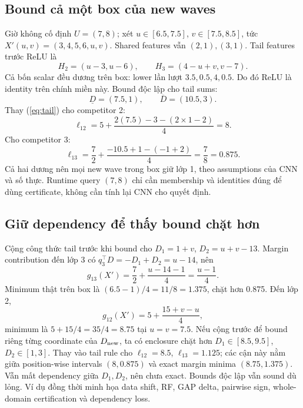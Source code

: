 \documentclass[11pt,a4paper]{article}
\theoremstyle{definition}
\begin{document}
\subsection{Bound cả một box của new waves}
Giờ không cố định $U=(7,8)$; xét $u\in[6.5,7.5]$, $v\in[7.5,8.5]$,
tức $X'(u,v)=(3,4,5,6,u,v)$. Shared features vẫn $(2,1),(3,1)$.
Tail features trước ReLU là
\begin{equation}
H_2=(u-3,u-6),\qquad H_3=(4-u+v,v-7).
\end{equation}
Cả bốn scalar đều dương trên box: lower lần lượt $3.5,0.5,4,0.5$.
Do đó ReLU là identity trên chính miền này. Bound độc lập cho tail sums:
\begin{equation}
\underline D=(7.5,1),\qquad\overline D=(10.5,3).
\end{equation}
Thay (\ref{eq:tail}) cho competitor 2:
\begin{equation}
\ell_{12}=5+\frac{2(7.5)-3-(2\times1-2)}4=8.
\end{equation}
Cho competitor 3:
\begin{equation}
\ell_{13}=\frac72+\frac{-10.5+1-(-1+2)}4=\frac78=0.875.
\end{equation}
Cả hai dương nên mọi new wave trong box giữ lớp 1, theo assumptions của
CNN và số thực. Runtime query $(7,8)$ chỉ cần membership và identities
đúng để dùng certificate, không cần tính lại CNN cho quyết định.

\subsection{Giữ dependency để thấy bound chặt hơn}
Cộng công thức tail trước khi bound cho
$D_1=1+v$, $D_2=u+v-13$. Margin contribution đến lớp 3 có
$q_3^\top D=-D_1+D_2=u-14$, nên
\begin{equation}
g_{13}(X')=\frac72+\frac{u-14-1}{4}=\frac{u-1}{4}.
\end{equation}
Minimum thật trên box là $(6.5-1)/4=11/8=1.375$, chặt hơn 0.875.
Đến lớp 2,
\begin{equation}
g_{12}(X')=5+\frac{15+v-u}{4},
\end{equation}
minimum là $5+15/4=35/4=8.75$ tại $u=v=7.5$.
Nếu cộng trước để bound riêng từng coordinate của $D_{\rm new}$,
ta có enclosure chặt hơn $D_1\in[8.5,9.5]$, $D_2\in[1,3]$.
Thay vào tail rule cho $\ell_{12}=8.5$, $\ell_{13}=1.125$; các cận này
nằm giữa position-wise intervals $(8,0.875)$ và exact margin minima
$(8.75,1.375)$. Vẫn mất dependency giữa $D_1,D_2$, nên chưa exact.
Bounds độc lập vẫn sound dù lỏng. Ví dụ đồng thời minh họa data shift,
RF, GAP delta, pairwise sign, whole-domain certification và dependency loss.
\end{document}
